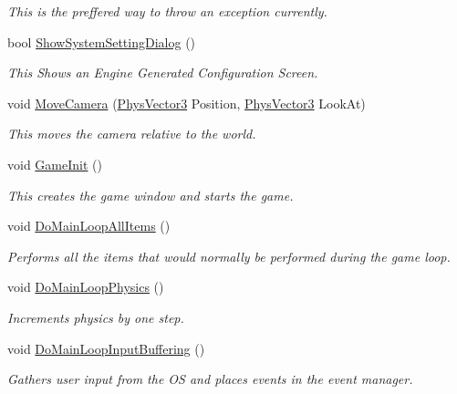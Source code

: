 \begin{DoxyCompactItemize}
\begin{DoxyCompactList}\small\item\em This is the preffered way to throw an exception currently. \item\end{DoxyCompactList}\item 
bool \hyperlink{classPhysWorld_a9b83f04907443c6307956a3c4089e3ca}{ShowSystemSettingDialog} ()
\begin{DoxyCompactList}\small\item\em This Shows an Engine Generated Configuration Screen. \item\end{DoxyCompactList}\item 
void \hyperlink{classPhysWorld_a1df24ee06d5881825902b60e0d81174a}{MoveCamera} (\hyperlink{classPhysVector3}{PhysVector3} Position, \hyperlink{classPhysVector3}{PhysVector3} LookAt)
\begin{DoxyCompactList}\small\item\em This moves the camera relative to the world. \item\end{DoxyCompactList}\item 
void \hyperlink{classPhysWorld_a6d65a7412c1711497fbd1173f879243a}{GameInit} ()
\begin{DoxyCompactList}\small\item\em This creates the game window and starts the game. \item\end{DoxyCompactList}\item 
void \hyperlink{classPhysWorld_a60b7978b39fc347c2f37077737783da6}{DoMainLoopAllItems} ()
\begin{DoxyCompactList}\small\item\em Performs all the items that would normally be performed during the game loop. \item\end{DoxyCompactList}\item 
void \hyperlink{classPhysWorld_a994d7d8c4a9a0c003c3e7d89be7b399b}{DoMainLoopPhysics} ()
\begin{DoxyCompactList}\small\item\em Increments physics by one step. \item\end{DoxyCompactList}\item 
void \hyperlink{classPhysWorld_a81b3f0dcc0a90d039623f696343e6e9c}{DoMainLoopInputBuffering} ()
\begin{DoxyCompactList}\small\item\em Gathers user input from the OS and places events in the event manager. \item\end{DoxyCompactList}\item 

\end{DoxyCompactItemize}

